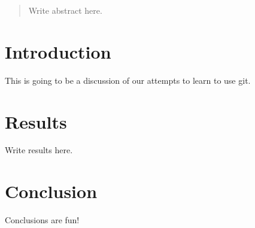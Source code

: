 \documentclass{article}
\begin{document}
\begin{abstract}
Write abstract here.
\end{abstract}

\section{Introduction}

This is going to be a discussion of our attempts to learn to use git.

\section{Results}

Write results here.

\section{Conclusion}

Conclusions are fun!
\end{document}
